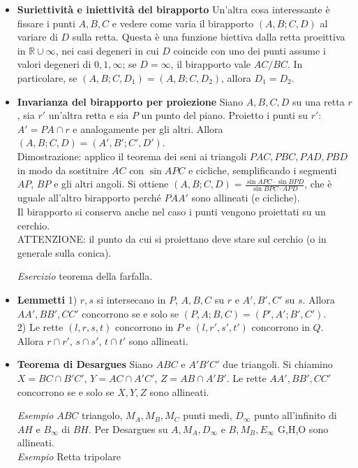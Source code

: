 \begin{itemize}
\item \textbf{Suriettività e iniettività del birapporto} Un'altra cosa interessante è fissare i punti $A,B,C$ e vedere come varia il birapporto $(A,B;C,D)$ al variare di $D$ sulla retta. Questa è una funzione biettiva dalla retta proeittiva in $\mathbb{R}\cup\infty$, nei casi degeneri in cui $D$ coincide con uno dei punti assume i valori degeneri di $0,1,\infty$; se $D=\infty$, il birapporto vale $AC/BC$. In particolare, se $(A,B;C,D_1)=(A,B;C,D_2)$, allora $D_1=D_2$.

\item \textbf{Invarianza del birapporto per proiezione} Siano $A,B,C,D$ su una retta $r$, sia $r'$ un'altra retta e sia $P$ un punto del piano. Proietto i punti su $r'$: $A'=PA\cap r$ e analogamente per gli altri. Allora $(A,B;C,D)=(A',B';C',D')$.\\
Dimostrazione: applico il teorema dei seni ai triangoli $PAC,PBC,PAD,PBD$ in modo da sostituire $AC$ con $\sin APC$ e cicliche, semplificando i segmenti $AP$, $BP$ e gli altri angoli. Si ottiene $(A,B;C,D)=\frac{\sin APC \cdot \sin BPD}{\sin BPC \cdot APD}$, che è uguale all'altro birapporto perché $PAA'$ sono allineati (e cicliche).\\
Il birapporto si conserva anche nel caso i punti vengono proiettati su un cerchio.\\
ATTENZIONE: il punto da cui si proiettano deve stare sul cerchio (o in generale sulla conica). 

\textit{Esercizio} teorema della farfalla.

\item \textbf{Lemmetti} 1) $r,s$ si intersecano in $P$, $A,B,C$ su $r$ e $A',B',C'$ su $s$. Allora $AA',BB',CC'$ concorrono se e solo se $(P,A;B,C)=(P',A';B',C')$.\\
2) Le rette $(l,r,s,t)$ concorrono in $P$ e $(l,r',s',t')$ concorrono in $Q$. Allora $r\cap r'$, $s \cap s'$, $t\cap t'$ sono allineati.

\item \textbf{Teorema di Desargues} Siano $ABC$ e $A'B'C'$ due triangoli. Si chiamino $X=BC\cap B'C'$, $Y=AC\cap A'C'$, $Z=AB\cap A'B'$. Le rette $AA',BB',CC'$ concorrono se e solo se $X,Y,Z$ sono allineati.

\textit{Esempio} $ABC$ triangolo, $M_A,M_B,M_C$ punti medi, $D_{\infty}$ punto all'infinito di $AH$ e $B_{\infty}$ di $BH$. Per Desargues su $A,M_A,D_\infty$ e $B,M_B,E_{\infty}$ G,H,O sono allineati. \\
\textit{Esempio} Retta tripolare



\end{itemize}
